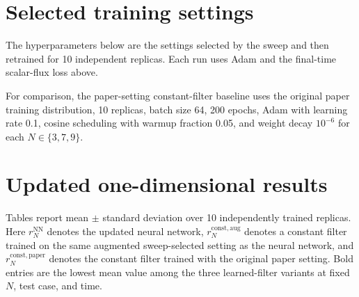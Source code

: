 \documentclass[10pt]{article}
\newcommand{\rNN}[1]{\ensuremath{r_{#1}^{\mathrm{NN}}}}
\newcommand{\rAugConst}[1]{\ensuremath{r_{#1}^{\mathrm{const,aug}}}}
\newcommand{\rPaperConst}[1]{\ensuremath{r_{#1}^{\mathrm{const,paper}}}}
\begin{document}
\section{Selected training settings}
The hyperparameters below are the settings selected by the sweep and then
retrained for 10 independent replicas.  Each run uses Adam and the final-time
scalar-flux loss above.
\begin{center}
\end{center}

For comparison, the paper-setting constant-filter baseline uses the original
paper training distribution, 10 replicas, batch size 64, 200 epochs, Adam with
learning rate 0.1, cosine scheduling with warmup fraction 0.05, and weight decay
\(10^{-6}\) for each \(N\in\{3,7,9\}\).

\section{Updated one-dimensional results}
Tables report mean \(\pm\) standard deviation over 10 independently trained
replicas.  Here \(\rNN{N}\) denotes the updated neural network,
\(\rAugConst{N}\) denotes a constant filter trained on the same augmented
sweep-selected setting as the neural network, and \(\rPaperConst{N}\) denotes the
constant filter trained with the original paper setting.  Bold entries are the
lowest mean value among the three learned-filter variants at fixed \(N\), test
case, and time.
\end{document}
